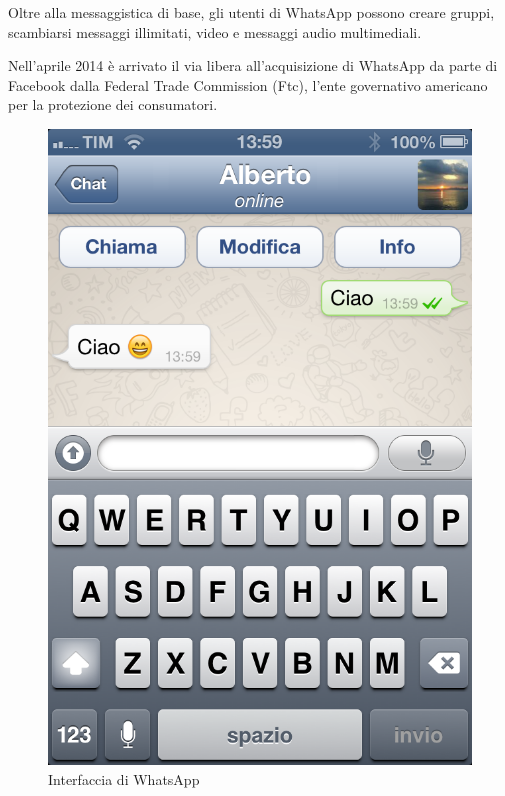 \documentclass[a4paper,11pt]{book}
\begin{document}
Oltre alla messaggistica di base, gli utenti di WhatsApp possono creare gruppi, scambiarsi messaggi illimitati, video e messaggi audio multimediali.

Nell'aprile 2014 \`e arrivato il via libera all'acquisizione di WhatsApp da parte di Facebook dalla Federal Trade Commission (Ftc), l'ente governativo americano per la protezione dei consumatori.

\begin{figure}[!ht]
\centering
\includegraphics[scale = 0.3]{Whatsapp.png}
\caption{Interfaccia di WhatsApp}
\end{figure}


\clearpage
\end{document}
